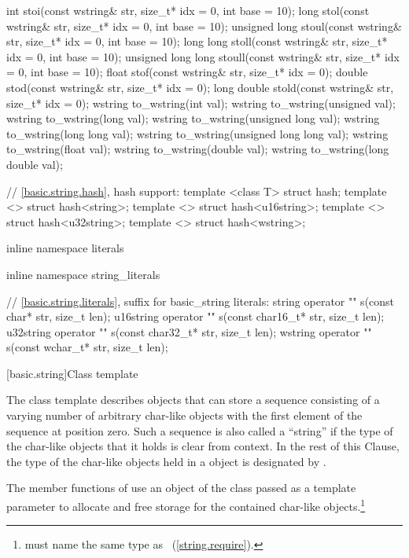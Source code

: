 \begin{codeblock}
{  int stoi(const wstring& str, size_t* idx = 0, int base = 10);
  long stol(const wstring& str, size_t* idx = 0, int base = 10);
  unsigned long stoul(const wstring& str, size_t* idx = 0, int base = 10);
  long long stoll(const wstring& str, size_t* idx = 0, int base = 10);
  unsigned long long stoull(const wstring& str, size_t* idx = 0, int base = 10);
  float stof(const wstring& str, size_t* idx = 0);
  double stod(const wstring& str, size_t* idx = 0);
  long double stold(const wstring& str, size_t* idx = 0);
  wstring to_wstring(int val);
  wstring to_wstring(unsigned val);
  wstring to_wstring(long val);
  wstring to_wstring(unsigned long val);
  wstring to_wstring(long long val);
  wstring to_wstring(unsigned long long val);
  wstring to_wstring(float val);
  wstring to_wstring(double val);
  wstring to_wstring(long double val);

  // \ref{basic.string.hash}, hash support:
  template <class T> struct hash;
  template <> struct hash<string>;
  template <> struct hash<u16string>;
  template <> struct hash<u32string>;
  template <> struct hash<wstring>;

inline namespace literals {
inline namespace string_literals {

  // \ref{basic.string.literals}, suffix for basic_string literals:
  string    operator "" s(const char* str, size_t len);
  u16string operator "" s(const char16_t* str, size_t len);
  u32string operator "" s(const char32_t* str, size_t len);
  wstring   operator "" s(const wchar_t* str, size_t len);

}
}
}
\end{codeblock}

[basic.string]{Class template }

\pnum
{}%
The
class template
describes objects that can store a sequence consisting of a varying number of
arbitrary char-like objects with the first element of the sequence at position zero.
Such a sequence is also called a ``string'' if the type of the
char-like objects that it holds
is clear from context.
In the rest of this Clause,
the type of the char-like objects held in a  object
is designated by .

\pnum
The
member functions of
 use an object of the
class passed as a template parameter to allocate and free storage for the
contained char-like objects.\footnote{ must name the same type
as ~(\ref{string.require}).}

